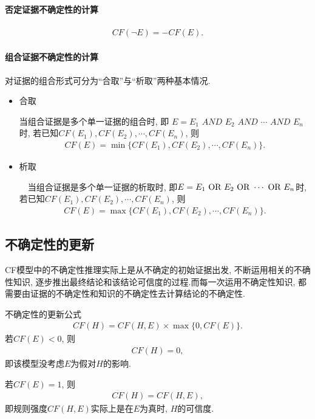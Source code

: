 \paragraph{ 否定证据不确定性的计算}
\begin{align}
  CF(\neg E)=-CF(E).
\end{align}
\paragraph{组合证据不确定性的计算}
对证据的组合形式可分为“合取”与“析取”两种基本情况.
\begin{itemize}
\item 合取

    当组合证据是多个单一证据的组合时, 即 $E=E_1\,\,  AND\,\,    E_2\,\,    AND \,\,   \cdots\,\,     AND \,\,   E_n$时, 若已知$CF(E_1), CF(E_2), \cdots , CF(E_n)$, 则
\begin{align}
  CF(E)=\min\{CF(E_1), CF(E_2), \cdots  ,CF(E_n)\}.
\end{align}
\item 析取

　当组合证据是多个单一证据的析取时, 即$E=E_1\,\,  \textup{OR}\,\,  E_2 \,\, \textup{OR}\,\,  \cdots \,\,  \textup{OR}\,\, E_n$时, 若已知$CF(E_1), CF(E_2), \cdots , CF(E_n)$, 则
\begin{align}
  CF(E)=\max\{CF(E_1), CF(E_2), \cdots  ,CF(E_n)\}.
\end{align}
\end{itemize}

\subsection{不确定性的更新}
 CF模型中的不确定性推理实际上是从不确定的初始证据出发, 不断运用相关的不确性知识, 逐步推出最终结论和该结论可信度的过程.而每一次运用不确定性知识, 都需要由证据的不确定性和知识的不确定性去计算结论的不确定性.

不确定性的更新公式
\begin{align}
  CF(H)=CF(H, E)\times \max\{0, CF(E)\}.
\end{align}
    若$CF(E)<0$, 则
\begin{align}
  CF(H)=0,
\end{align}
即该模型没考虑$E$为假对$H$的影响.

若$CF(E)=1$, 则
\begin{align}
  CF(H)=CF(H,E),
\end{align}
即规则强度$CF(H,E)$实际上是在$E$为真时, $H$的可信度.
